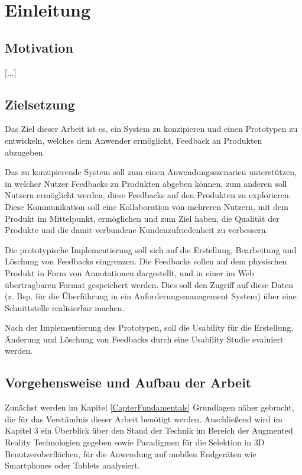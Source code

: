 \chapter{Einleitung}

\section{Motivation}

[...]

\section{Zielsetzung}

Das Ziel dieser Arbeit ist es, ein System zu konzipieren und einen Prototypen zu entwickeln, welches dem Anwender ermöglicht, Feedback an Produkten
abzugeben. 

Das zu konzipierende System soll zum einen Anwendungsszenarien unterstützen, in welcher Nutzer Feedbacks zu Produkten abgeben können, 
zum anderen soll Nutzern ermöglicht werden, diese Feedbacks auf den Produkten zu explorieren. 
Diese Kommunikation soll eine Kollaboration von mehreren Nutzern, mit dem Produkt im Mittelpunkt, ermöglichen und zum Ziel haben, die Qualität der 
Produkte und die damit verbundene Kundenzufriedenheit zu verbessern.

Die prototypische Implementierung soll sich auf die Erstellung, Bearbeitung und Löschung von Feedbacks eingrenzen. Die Feedbacks sollen auf dem physischen 
Produkt in Form von Annotationen dargestellt, und in einer im Web übertragbaren Format gespeichert werden. Dies soll den Zugriff auf diese Daten 
(z. Bsp. für die Überführung in ein Anforderungsmanagement System) über eine Schnittstelle realisierbar machen.  

Nach der Implementierung des Prototypen, soll die Usability für die Erstellung, Änderung und Löschung von Feedbacks durch 
eine Usability Studie evaluiert werden. 

\section{Vorgehensweise und Aufbau der Arbeit}

Zunächst werden im Kapitel \ref{CapterFundamentals} Grundlagen näher gebracht, die für das Verständnis dieser Arbeit benötigt werden. Anschließend wird 
im Kapitel 3 ein Überblick über den Stand der Technik im Bereich der Augmented Reality Technologien gegeben sowie Paradigmen für die Selektion in 3D Benutzeroberflächen, 
für die Anwendung auf mobilen Endgeräten wie Smartphones oder Tablets analysiert.  
 
